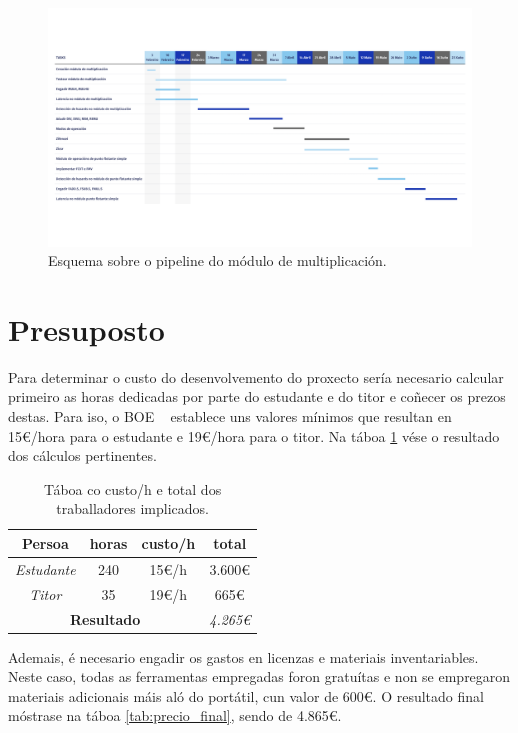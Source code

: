 \begin{figure}[hp!]
  \centering
  \includegraphics[width=\textwidth]{imaxes/Gantt - TFG.png}
  \caption{Esquema sobre o pipeline do módulo de multiplicación.}
  \label{fig:gantt}
\end{figure}

\section{Presuposto}\label{sec:presuposto}
Para determinar o custo do desenvolvemento do proxecto sería necesario calcular primeiro as horas dedicadas por parte do estudante e do titor e coñecer os prezos destas. Para iso, o BOE ~\cite{boe} establece uns valores mínimos que resultan en 15€/hora para o estudante e 19€/hora para o titor. Na táboa \ref{tab:salario} vése o resultado dos cálculos pertinentes.

\begin{table}[hp!]
    \centering
    \begin{tabular}{c|c|c|c}
    \rowcolor{udcpink!25}
    \textbf{Persoa} & \textbf{horas}  & \textbf{custo/h} & \textbf{total} 
    \\\hline
    \textit{Estudante} & 240 & 15€/h & 3.600€\\
    \textit{Titor} & 35 & 19€/h & 665€\\
    \multicolumn{3}{c|}{\textbf{Resultado}} & \textit{4.265€} \\
    \end{tabular}
    \caption{Táboa co custo/h e total dos traballadores implicados.}
    \label{tab:salario}
\end{table}

Ademais, é necesario engadir os gastos en licenzas e materiais inventariables. Neste caso, todas as ferramentas empregadas foron gratuítas e non se empregaron materiais adicionais máis aló do portátil, cun valor de 600€. O resultado final móstrase na táboa \ref{tab:precio_final}, sendo de 4.865€.

